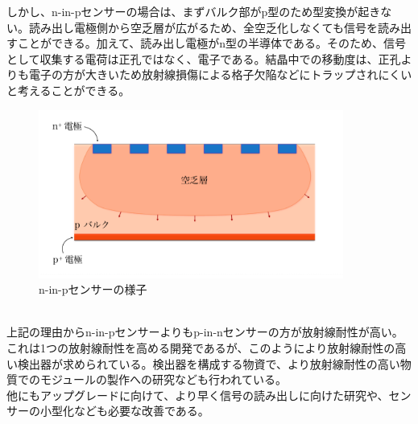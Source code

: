 \documentclass{jreport}
\begin{document}
しかし、n-in-pセンサーの場合は、まずバルク部がp型のため型変換が起きない。読み出し電極側から空乏層が広がるため、全空乏化しなくても信号を読み出すことができる。加えて、読み出し電極がn型の半導体である。そのため、信号として収集する電荷は正孔ではなく、電子である。結晶中での移動度は、正孔よりも電子の方が大きいため放射線損傷による格子欠陥などにトラップされにくいと考えることができる。\\
\begin{figure}[htbp]
	\begin{center}
	\includegraphics[width=100mm]{n-in-p.png}
	\end{center}
	\caption{n-in-pセンサーの様子}
	\label{fig:ten}
\end{figure}
\\
上記の理由からn-in-pセンサーよりもp-in-nセンサーの方が放射線耐性が高い。\\
これは1つの放射線耐性を高める開発であるが、このようにより放射線耐性の高い検出器が求められている。検出器を構成する物資で、より放射線耐性の高い物質でのモジュールの製作への研究なども行われている。\\
他にもアップグレードに向けて、より早く信号の読み出しに向けた研究や、センサーの小型化なども必要な改善である。
\end{document}
